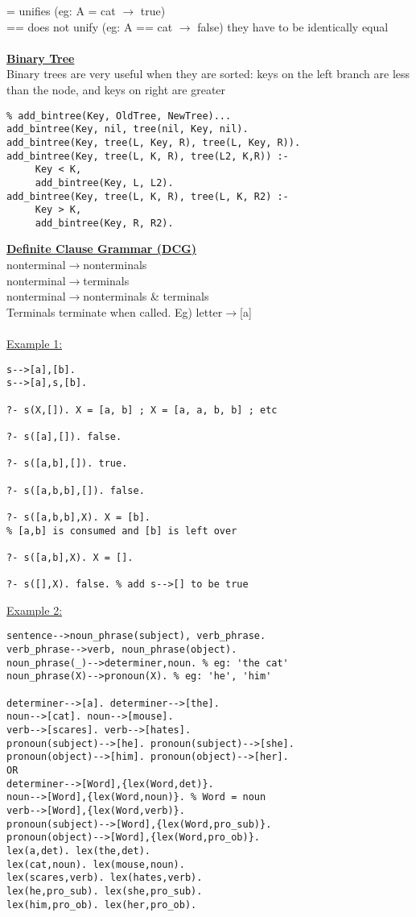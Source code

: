 \documentclass[8pt,letterpaper,twocolumn]{article}
\begin{document}
= unifies (eg: A = cat $\rightarrow$ true)\\
== does not unify (eg: A == cat $\rightarrow$ false) they have to be identically equal\\
\\
\underline{\textbf{Binary Tree}}\\
Binary trees are very useful when they are sorted: keys on the left
branch are less than the node, and keys on right are greater
\begin{verbatim}
% add_bintree(Key, OldTree, NewTree)...
add_bintree(Key, nil, tree(nil, Key, nil).
add_bintree(Key, tree(L, Key, R), tree(L, Key, R)).
add_bintree(Key, tree(L, K, R), tree(L2, K,R)) :-
     Key < K,
     add_bintree(Key, L, L2).
add_bintree(Key, tree(L, K, R), tree(L, K, R2) :-
     Key > K,
     add_bintree(Key, R, R2).
\end{verbatim}
\underline{\textbf{Definite Clause Grammar (DCG)}}\\
nonterminal$\rightarrow$nonterminals\\
nonterminal$\rightarrow$terminals\\
nonterminal$\rightarrow$nonterminals \& terminals\\
Terminals terminate when called. Eg) letter$\rightarrow$[a]\\
\\
\underline{Example 1:}
\begin{verbatim}
s-->[a],[b].
s-->[a],s,[b].

?- s(X,[]). X = [a, b] ; X = [a, a, b, b] ; etc

?- s([a],[]). false.

?- s([a,b],[]). true.

?- s([a,b,b],[]). false.

?- s([a,b,b],X). X = [b].
% [a,b] is consumed and [b] is left over

?- s([a,b],X). X = [].

?- s([],X). false. % add s-->[] to be true
\end{verbatim}
\underline{Example 2:}
\begin{verbatim}
sentence-->noun_phrase(subject), verb_phrase.
verb_phrase-->verb, noun_phrase(object).
noun_phrase(_)-->determiner,noun. % eg: 'the cat'
noun_phrase(X)-->pronoun(X). % eg: 'he', 'him'

determiner-->[a]. determiner-->[the].
noun-->[cat]. noun-->[mouse].
verb-->[scares]. verb-->[hates].
pronoun(subject)-->[he]. pronoun(subject)-->[she].
pronoun(object)-->[him]. pronoun(object)-->[her].
OR
determiner-->[Word],{lex(Word,det)}.
noun-->[Word],{lex(Word,noun)}. % Word = noun
verb-->[Word],{lex(Word,verb)}.
pronoun(subject)-->[Word],{lex(Word,pro_sub)}.
pronoun(object)-->[Word],{lex(Word,pro_ob)}.
lex(a,det). lex(the,det).
lex(cat,noun). lex(mouse,noun).
lex(scares,verb). lex(hates,verb).
lex(he,pro_sub). lex(she,pro_sub).
lex(him,pro_ob). lex(her,pro_ob).
\end{verbatim}
\end{document}

